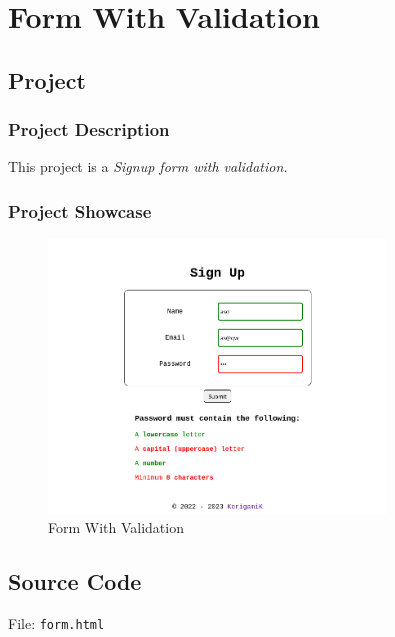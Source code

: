 \section{Form With Validation}\label{sec:form}

\subsection{Project}

\subsubsection*{Project Description}

This project is a \textit{Signup form with validation.}

\subsubsection*{Project Showcase}
\begin{figure}[H]
	\centering
	\includegraphics[width=0.8\textwidth]{res/form.png}
	\caption{Form With Validation}
	\label{fig:form}
\end{figure}

\subsection{Source Code}

File: \texttt{form.html}
